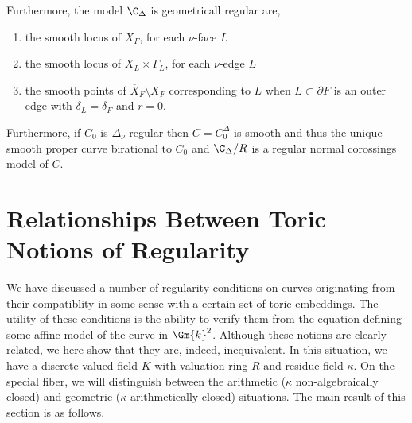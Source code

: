\begin{theorem}[DK, Thm. 3.14]
\begin{enumerate}
\end{enumerate}
Furthermore, the model $\C_\Delta$ is geometricall regular are,
\begin{enumerate}
\item the smooth locus of $X_F$, for each $\nu$-face $L$
\item the smooth locus of $X_L \times \Gamma_L$, for each $\nu$-edge $L$
\item the smooth points of $\overline{X}_F \setminus X_F$ corresponding to $L$ when $L \subset \partial F$ is an outer edge with $\delta_L = \delta_F$ and $r = 0$. 
\end{enumerate}
Furthermore, if $C_0$ is $\Delta_\nu$-regular then $C = C_0^\Delta$ is smooth and thus the unique smooth proper curve birational to $C_0$ and $\C_\Delta / R$ is a regular normal corossings model of $C$. 
\end{theorem}

\section{Relationships Between Toric Notions of Regularity}

We have discussed a number of regularity conditions on curves originating from their compatiblity in some sense with a certain set of toric embeddings. The utility of these conditions is the ability to verify them from the equation defining some affine model of the curve in $\Gm{k}^2$. Although these notions are clearly related, we here show that they are, indeed, inequivalent. In this situation, we have a discrete valued field $K$ with valuation ring $R$ and residue field $\kappa$. On the special fiber, we will distinguish between the arithmetic ($\kappa$ non-algebraically closed) and geometric ($\kappa$ arithmetically closed) situations. The main result of this section is as follows.

